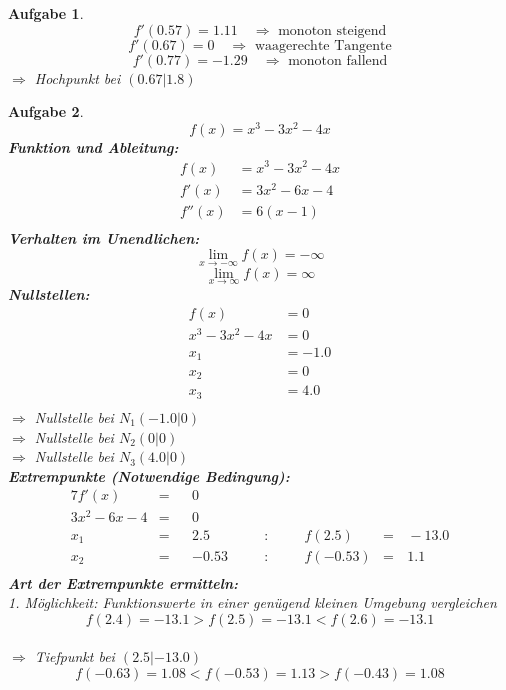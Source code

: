 \documentclass[12pt]{article}
\theoremstyle{note}
\newtheorem{aufgabe}{Aufgabe}
\begin{document}
\begin{flushleft}
\begin{aufgabe}
\vspace{1em}$$f'(0.57)=1.11\quad \Rightarrow \text{ monoton steigend} $$$$f'(0.67)=0 \quad \Rightarrow \text{ waagerechte Tangente} $$$$f'(0.77)=-1.29\quad \Rightarrow \text{ monoton fallend} $$$\Rightarrow$ Hochpunkt bei $(0.67|1.8)$ \\ 
\vspace{1em}
\end{aufgabe}\clearpage\begin{aufgabe} ~  
$$f(x)=x^{3} - 3 x^{2} - 4 x$$ 
{\bf Funktion und Ableitung:} 
\begin{align*} 
f(x)&=x^{3} - 3 x^{2} - 4 x\\ 
f'(x)&=3 x^{2} - 6 x - 4\\ 
f''(x)&=6 \left(x - 1\right)\\ 
\end{align*} 
{\bf Verhalten im Unendlichen:} 
\[ \lim_{x\rightarrow -\infty} f(x) =-\infty\]\[ \lim_{x\rightarrow\infty} f(x) =\infty\]{\bf Nullstellen:} 
\begin{align*} 
f(x)&=0 \\ 
x^{3} - 3 x^{2} - 4 x&=0 \\ 
x_1&=-1.0\\ 
x_2&=0\\ 
x_3&=4.0\\ 
\end{align*} 
$\Rightarrow$ Nullstelle bei $N_1(-1.0|0)$ \\ 
$\Rightarrow$ Nullstelle bei $N_2(0|0)$ \\ 
$\Rightarrow$ Nullstelle bei $N_3(4.0|0)$ \\ 
{\bf Extrempunkte (Notwendige Bedingung):} 
\begin{alignat*}{7} 
f'(x)&=& &0& \\ 
3 x^{2} - 6 x - 4&=& &0& \\ 
x_1&=& &2.5& \quad &:& \quad &f(2.5)&=& \,-13.0\\ 
x_2&=& &-0.53& \quad &:& \quad &f(-0.53)&=& \,1.1\\ 
\end{alignat*} 
{\bf Art der Extrempunkte ermitteln:} \\[1em] 
{\em 1. M\"oglichkeit:} Funktionswerte in einer gen\"ugend kleinen Umgebung vergleichen \\ 
$$f(2.4)=-13.1  >  f(2.5)=-13.1  <   f(2.6)=-13.1$$\\ 
$\Rightarrow$ Tiefpunkt bei $(2.5|-13.0)$ \\ 
\vspace{1em}$$f(-0.63)=1.08  <  f(-0.53)=1.13  >  f(-0.43)=1.08$$\\ 

\end{aufgabe}
\end{flushleft}
\end{document}
